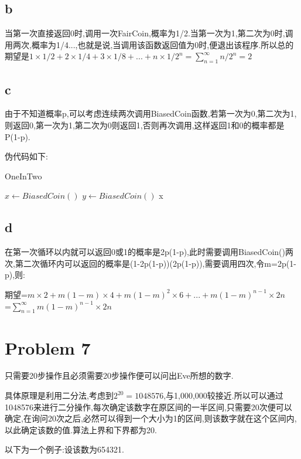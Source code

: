 \documentclass[12pt,a4paper,fontset=none]{ctexart}
\begin{document}
\subsection*{b}
当第一次直接返回0时,调用一次FairCoin,概率为1/2.当第一次为1,第二次为0时,调用两次,概率为1/4...,也就是说,当调用该函数返回值为0时,便退出该程序.所以总的期望是$1\times 1/2+2\times 1/4+3\times 1/8+...+n\times 1/2^n=\sum_{n=1}^\infty n/2^n=2$
\subsection*{c}
由于不知道概率p,可以考虑连续两次调用BiasedCoin函数,若第一次为0,第二次为1,则返回0,第一次为1,第二次为0则返回1,否则再次调用,这样返回1和0的概率都是P(1-p).

伪代码如下:

\begin{algorithm}
    \caption{OneInTwo}
    \label{alg3}
    \begin{algorithmic}
        \State $x\gets BiasedCoin()$
        \State $y\gets BiasedCoin()$
        \Return x
        \EndIf
        \EndWhile
    \end{algorithmic}
\end{algorithm}
\subsection*{d}
在第一次循环以内就可以返回0或1的概率是2p(1-p),此时需要调用BiasedCoin()两次,第二次循环内可以返回的概率是(1-2p(1-p))(2p(1-p)),需要调用四次,令m=2p(1-p),则:

期望=$m\times 2+m(1-m)\times 4+m(1-m)^2\times 6+...+m(1-m)^{n-1}\times 2n$\\=$\sum_{n=1}^{\infty} m(1-m)^{n-1}\times 2n$
\section*{Problem 7}
只需要20步操作且必须需要20步操作便可以问出Eve所想的数字.

具体原理是利用二分法,考虑到$2^{20}=1048576$,与1,000,000较接近.所以可以通过1048576来进行二分操作,每次确定该数字在原区间的一半区间,只需要20次便可以确定,在询问20次之后,必然可以得到一个大小为1的区间,则该数字就在这个区间内,以此确定该数的值.算法上界和下界都为20.

以下为一个例子:设该数为654321.
\end{document}

